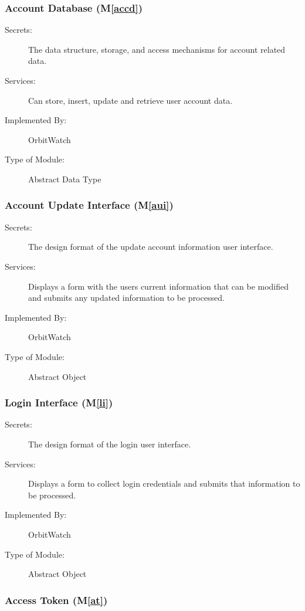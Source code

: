\documentclass[12pt, titlepage]{article}
\newcommand{\mref}[1]{M\ref{#1}}
\begin{document}
\subsubsection{Account Database (\mref{accd})}

\begin{description}
\item[Secrets:] The data structure, storage, and access mechanisms for account related data.
\item[Services:] Can store, insert, update and retrieve user account data.
\item[Implemented By:] OrbitWatch
\item[Type of Module:] Abstract Data Type
\end{description}

\subsubsection{Account Update Interface (\mref{aui})}

\begin{description}
\item[Secrets:]The design format of the update account information user interface.
\item[Services:] Displays a form with the users current information that can be modified and submits any updated information to be processed.
\item[Implemented By:] OrbitWatch
\item[Type of Module:] Abstract Object
\end{description}

\subsubsection{Login Interface (\mref{li})}

\begin{description}
\item[Secrets:]The design format of the login user interface.
\item[Services:] Displays a form to collect login credentials and submits that information to be processed.
\item[Implemented By:] OrbitWatch
\item[Type of Module:] Abstract Object
\end{description}

\subsubsection{Access Token (\mref{at})}
\end{document}

